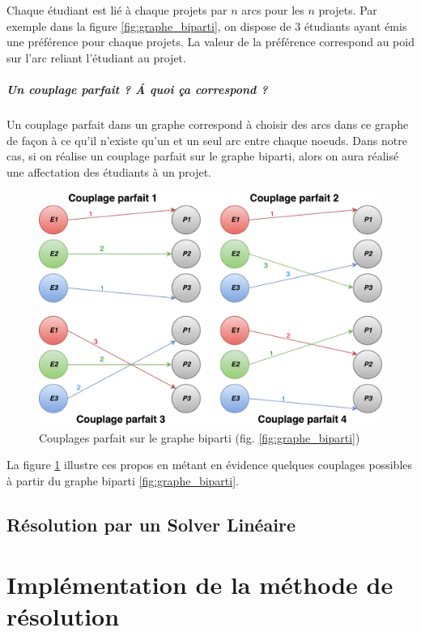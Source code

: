\documentclass{polytech/polytech}
\begin{document}
Chaque étudiant est lié à chaque projets par $n$ arcs pour les $n$ projets. Par exemple dans la figure \ref{fig:graphe_biparti}, on dispose de 3 étudiants ayant émis une préférence pour chaque projets. La valeur de la préférence correspond au poid sur l'arc reliant l'étudiant au projet.

\subparagraph{Un couplage parfait ? \'A quoi ça correspond ?}

Un couplage parfait dans un graphe correspond à choisir des arcs dans ce graphe de façon à ce qu'il n'existe qu'un et un seul arc entre chaque noeuds.
Dans notre cas, si on réalise un couplage parfait sur le graphe biparti, alors on aura réalisé une affectation des étudiants à un projet. 

\begin{figure}[htbp]
\includegraphics[width=12cm]{images/graphe_biparti_couplage_parfait}
\caption{\label{fig:graphe_biparti_couplage_parfait}Couplages parfait sur le graphe biparti (fig. \ref{fig:graphe_biparti})}
\end{figure}

La figure \ref{fig:graphe_biparti_couplage_parfait} illustre ces propos en métant en évidence quelques couplages possibles à partir du graphe biparti \ref{fig:graphe_biparti}.

\subsection{Résolution par un Solver Linéaire}

\section{Implémentation de la méthode de résolution}
\end{document}
